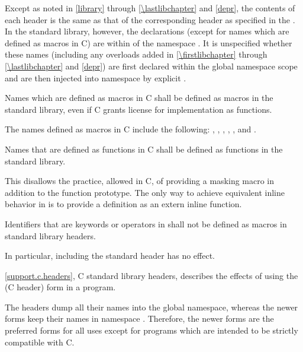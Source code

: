 \pnum
Except as noted in \ref{library} through \ref{\lastlibchapter}
and \ref{depr}, the contents of each header  is
the same as that of the corresponding header  as
specified in the .
In the \Cpp{} standard library, however, the
declarations (except for names which are defined as macros in C) are within
 of the namespace .
It is unspecified whether these names (including any overloads added in
\ref{\firstlibchapter} through \ref{\lastlibchapter} and \ref{depr})
are first declared within the global namespace scope
and are then injected into namespace  by explicit
.

\pnum
Names which are defined as macros in C shall be defined as macros in the \Cpp{}
standard library, even if C grants license for implementation as functions.
\begin{note}
The names defined as macros in C include the following:
, , , ,
, and .
\end{note}

\pnum
Names that are defined as functions in C shall be defined as functions in the
\Cpp{} standard library.
\begin{footnote}
This disallows the practice, allowed in C, of
providing a masking macro in addition to the function prototype. The only way to
achieve equivalent inline behavior in \Cpp{} is to provide a definition as an
extern inline function.
\end{footnote}

\pnum
Identifiers that are keywords or operators in \Cpp{} shall not be defined as
macros in \Cpp{} standard library headers.
\begin{footnote}
In particular, including the
standard header  has no effect.
\end{footnote}

\pnum
\ref{support.c.headers}, C standard library headers, describes the effects of using
the  (C header) form in a \Cpp{} program.
\begin{footnote}
 The
 headers dump all their names into the global namespace, whereas the
newer forms keep their names in namespace . Therefore, the newer
forms are the preferred forms for all uses except for \Cpp{} programs which are
intended to be strictly compatible with C.
\end{footnote}

